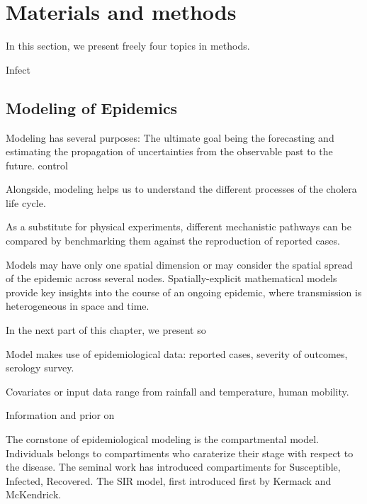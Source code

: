 

\chapter[Materials and methods]{Materials and methods} %

In this section, we present freely four topics in methods.

Infect

\section{Modeling of Epidemics}
Modeling has several purposes:
The ultimate goal being  the forecasting and estimating the propagation of uncertainties from the observable past to the future. control

Alongside, modeling helps us to understand the different processes of the cholera life cycle. 

As a substitute for physical experiments, different mechanistic pathways can be compared by benchmarking them against the reproduction of reported cases. 

Models may have only one spatial dimension or may consider the spatial spread of the epidemic across several nodes. Spatially-explicit mathematical models provide key insights into the course of an ongoing epidemic, where transmission is heterogeneous in space and time.



In the next part of this chapter, we present so

Model makes use of epidemiological data: reported cases, severity of outcomes, serology survey. 

Covariates or input data range from rainfall and temperature, human mobility.

Information and prior on

The cornstone of epidemiological modeling is the compartmental model. Individuals belongs to compartiments who caraterize their stage with respect to the disease. The seminal work has introduced compartiments for Susceptible, Infected, Recovered. The SIR model, first introduced first by Kermack and McKendrick\cite{Kermack:ContributionMathematicalTheory:1927}. 


